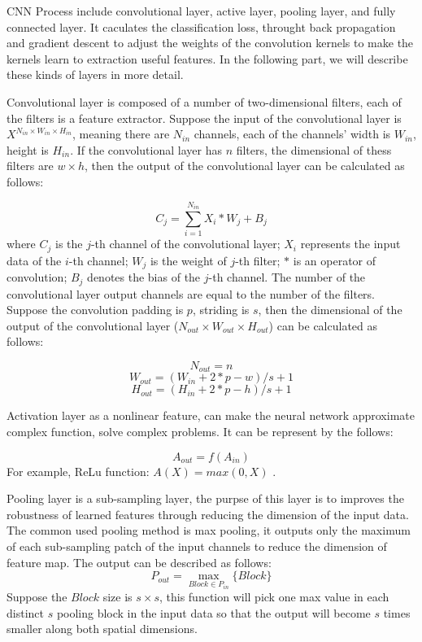 \documentclass[sensors,article,submit,moreauthors,pdftex,10pt,a4paper]{mdpi}
\begin{document}
CNN Process include convolutional layer, active layer, pooling layer, and fully connected layer. It caculates the classification loss, throught back propagation and gradient descent to adjust the weights of the convolution kernels to make the kernels learn to extraction useful features. In the following part, we will describe these kinds of layers in more detail. 

Convolutional layer is composed of a number of two-dimensional filters, each of the filters is a feature extractor. Suppose the input of the convolutional layer is $X^{N_{in} \times W_{in} \times H_{in}}$, meaning there are $N_{in}$ channels, each of the channels' width is $W_{in}$, height is $H_{in}$. If the convolutional layer has $n$ filters, the dimensional of thess filters are $w \times h$, then the output of the convolutional layer can be calculated as follows\cite{ConvolutinFormula}:

\begin{equation}
C_j = \sum_{i=1}^{N_{in}}X_i*W_j + B_j
\end{equation}
where $C_j$ is the $j$-th channel of the convolutional layer; $X_i$ represents the input data of the $i$-th channel; $W_j$ is the weight of $j$-th filter; $*$ is an operator of convolution; $B_j$ denotes the bias of the $j$-th channel. The number of the convolutional layer output channels are equal to the number of the filters. Suppose the convolution padding is $p$, striding is $s$, then the dimensional of the output of the convolutional layer ($N_{out} \times W_{out} \times H_{out}$) can be calculated as follows:

\begin{equation}
N_{out} = n
\end{equation}
\begin{equation}
W_{out} = (W_{in} + 2*p -w) / s + 1
\end{equation}
\begin{equation}
H_{out} = (H_{in} + 2*p -h) / s + 1
\end{equation}

Activation layer as a nonlinear feature, can make the neural network approximate complex function, solve complex problems. It can be represent by the follows:

\begin{equation}
A_{out} = f(A_{in})
\end{equation}
For example, ReLu function\cite{ReLu}: $A(X) = max(0,X)$ .

Pooling layer is a sub-sampling layer, the purpse of this layer is to improves the robustness of learned features through reducing the dimension of the input data. The common used pooling method is max pooling, it outputs only the maximum of each sub-sampling patch of the input channels to reduce the dimension of feature map. The output can be described as follows\cite{ConvolutinFormula}:
\begin{equation}
P_{out} = \max_{Block\in{P_{in}}}\{Block\}
\end{equation}
Suppose the $Block$ size is $s \times s$, this function will pick one max value in each distinct $s$ pooling block in the input data so that the output will become $s$ times smaller along both spatial dimensions.
\end{document}
